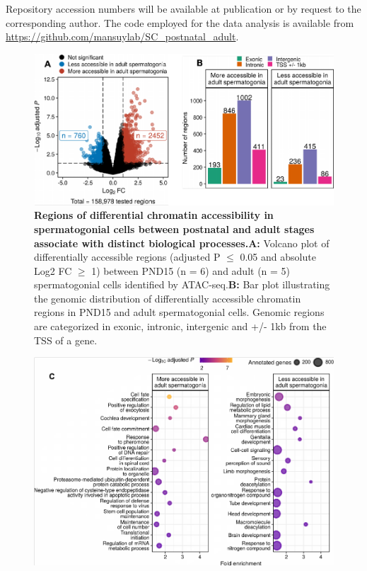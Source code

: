 \documentclass[12pt,twoside]{reedthesis}
\begin{document}
Repository accession numbers will be available at publication or by
request to the corresponding author. The code employed for the data
analysis is available from
\url{https://github.com/mansuylab/SC_postnatal_adult}.
\begin{subfigures}

\begin{figure}[H]

{\centering \includegraphics{thesis_files/figure-latex/df1a-1} 

}

\caption[Regions of differential chromatin accessibility in spermatogonial cells between postnatal and adult stages]{\textbf{Regions of differential chromatin accessibility in spermatogonial cells between postnatal and adult stages associate with distinct biological processes.}\newline \textbf{A:} Volcano plot of differentially accessible regions (adjusted P $\leq$ 0.05 and absolute Log2 FC $\geq$ 1) between PND15 (n = 6) and adult (n = 5) spermatogonial cells identified by ATAC-seq.\newline \textbf{B:} Bar plot illustrating the genomic distribution of differentially accessible chromatin regions in PND15 and adult spermatogonial cells. Genomic regions are categorized in exonic, intronic, intergenic and +/- 1kb from the TSS of a gene.}\label{fig:df1a}
\end{figure}

\begin{figure}[H]

{\centering \includegraphics{thesis_files/figure-latex/df1b-1} 

}
\end{figure}
\end{subfigures}
\end{document}
